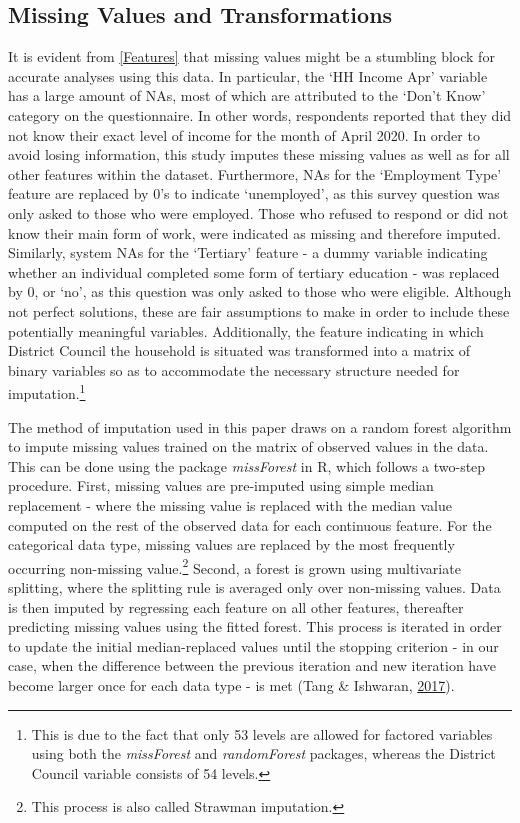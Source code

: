 \documentclass[11pt,preprint, authoryear]{elsarticle}
\numberwithin{equation}{section}
\numberwithin{figure}{section}
\numberwithin{table}{section}
\let\rmarkdownfootnote\footnote%
\def\footnote{\protect\rmarkdownfootnote}
\begin{document}
\hypertarget{missing-values-and-transformations}{%
\subsection*{Missing Values and
Transformations}\label{missing-values-and-transformations}}

It is evident from \ref{Features} that missing values might be a
stumbling block for accurate analyses using this data. In particular,
the `HH Income Apr' variable has a large amount of NAs, most of which
are attributed to the `Don't Know' category on the questionnaire. In
other words, respondents reported that they did not know their exact
level of income for the month of April 2020. In order to avoid losing
information, this study imputes these missing values as well as for all
other features within the dataset. Furthermore, NAs for the `Employment
Type' feature are replaced by 0's to indicate `unemployed', as this
survey question was only asked to those who were employed. Those who
refused to respond or did not know their main form of work, were
indicated as missing and therefore imputed. Similarly, system NAs for
the `Tertiary' feature - a dummy variable indicating whether an
individual completed some form of tertiary education - was replaced by
0, or `no', as this question was only asked to those who were eligible.
Although not perfect solutions, these are fair assumptions to make in
order to include these potentially meaningful variables. Additionally,
the feature indicating in which District Council the household is
situated was transformed into a matrix of binary variables so as to
accommodate the necessary structure needed for imputation.\footnote{This
  is due to the fact that only 53 levels are allowed for factored
  variables using both the \emph{missForest} and \emph{randomForest}
  packages, whereas the District Council variable consists of 54 levels.}

The method of imputation used in this paper draws on a random forest
algorithm to impute missing values trained on the matrix of observed
values in the data. This can be done using the package \emph{missForest}
in R, which follows a two-step procedure. First, missing values are
pre-imputed using simple median replacement - where the missing value is
replaced with the median value computed on the rest of the observed data
for each continuous feature. For the categorical data type, missing
values are replaced by the most frequently occurring non-missing
value.\footnote{This process is also called Strawman imputation.}
Second, a forest is grown using multivariate splitting, where the
splitting rule is averaged only over non-missing values. Data is then
imputed by regressing each feature on all other features, thereafter
predicting missing values using the fitted forest. This process is
iterated in order to update the initial median-replaced values until the
stopping criterion - in our case, when the difference between the
previous iteration and new iteration have become larger once for each
data type - is met (Tang \& Ishwaran,
\protect\hyperlink{ref-tang2017random}{2017}).
\end{document}
